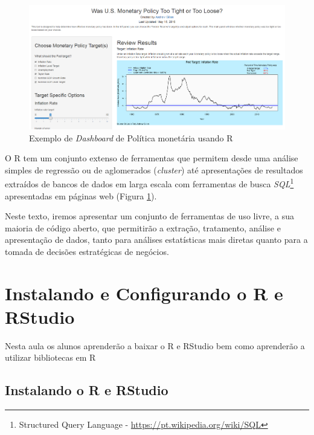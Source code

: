\documentclass[12pt,a4paper,oneside]{erdc}
\begin{document}
\begin{figure}
	\centering
	\includegraphics[width=\linewidth]{../figs/f-Intro-01-Monetary-Policy}
	\caption{Exemplo de \textit{Dashboard} de Política monetária usando R \cite{Showmeshiny2019}}
	\label{fig:f-intro-01}
\end{figure}

O R tem um conjunto extenso de ferramentas que permitem desde uma análise simples de regressão ou de aglomerados (\textit{cluster}) até apresentações de resultados extraídos de bancos de dados em larga escala com ferramentas de busca \textit{SQL}\footnote{Structured Query Language - \url{https://pt.wikipedia.org/wiki/SQL}} apresentadas em páginas web (Figura \ref{fig:f-intro-01}).

Neste texto, iremos apresentar um conjunto de ferramentas de uso livre, a sua maioria de código aberto, que permitirão a extração, tratamento, análise e apresentação de dados, tanto para análises estatísticas mais diretas quanto para a tomada de decisões estratégicas de negócios.




%
%
%


\chapter{Instalando e Configurando o R e RStudio}


Nesta aula os alunos aprenderão a baixar o R e RStudio bem como aprenderão a utilizar bibliotecas em R


\section{Instalando o R e RStudio}
\end{document}
